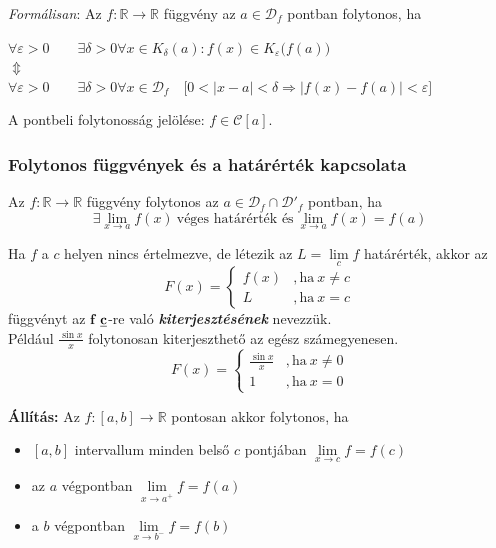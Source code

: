 \documentclass[tikz,12pt,margin=0px]{article}
\newcommand\ddfrac[2]{\frac{\displaystyle #1}{\displaystyle #2}}
\begin{document}
    \noindent \emph{Formálisan}: Az $f : \mathbb{R} \to \mathbb{R}$ függvény az $a \in \mathcal{D}_{f}$ pontban folytonos, ha
    \begin{center}
        $\forall \varepsilon > 0\qquad \exists \delta > 0$\qquad $\forall x \in K_{\delta}(a) : f(x) \in K_{\varepsilon}\Big(f(a)\Big)$ \\
        $\Updownarrow$\\
        $\forall \varepsilon > 0\qquad \exists \delta > 0$\qquad $\forall x \in \mathcal{D}_{f}\quad  \Big[0 < \big|x-a\big| < \delta \Rightarrow \big|f(x)-f(a)\big| < \varepsilon\Big]$\\
    \end{center}

	\noindent A pontbeli folytonosság jelölése: $f \in \mathcal{C}[a]$.

    \subsubsection*{Folytonos függvények és a határérték kapcsolata}

    \noindent Az $f : \mathbb{R} \to \mathbb{R}$ függvény folytonos az $a \in \mathcal{D}_{f} \cap \mathcal{D}'_{f}$ pontban, ha
    \[
        \exists \lim\limits_{x \to a}f(x)\ \text{véges határérték és}\ \lim\limits_{x \to a}f(x) = f(a)
    \]

    \noindent Ha $f$ a $c$ helyen nincs értelmezve, de létezik az $L = \lim\limits_{c}f$ határérték, akkor az
    \[
        F(x) = \left\{\begin{array}{cc}
                        f(x) & , \text{ha}\ x \neq c \\
                        L & , \text{ha}\ x = c
                      \end{array}
         \right.
    \]
    függvényt az $\textbf{f}$ $\emph{\textbf{c}}$-re való \emph{\textbf{kiterjesztésének}} nevezzük.\\

    \noindent Például $\ddfrac{\sin{x}}{x}$ folytonosan kiterjeszthető az egész számegyenesen.
    \[
        F(x) = \left\{\begin{array}{cc}
                        \ddfrac{\sin{x}}{x} & , \text{ha}\ x \neq 0 \\
                        1 & , \text{ha}\ x = 0
                      \end{array}
         \right.
    \]

    \noindent \textbf{Állítás:} Az $f: [a,b] \rightarrow \mathbb{R}$ pontosan akkor folytonos, ha
    \begin{itemize}
        \item $[a, b]$ intervallum minden belső $c$ pontjában $\lim\limits_{x \to c}f = f(c)$
        \item az $a$ végpontban $\lim\limits_{x \to a^{+}}f = f(a)$
        \item a $b$ végpontban $\lim\limits_{x \to b^{-}}f = f(b)$
    \end{itemize}
\end{document}
